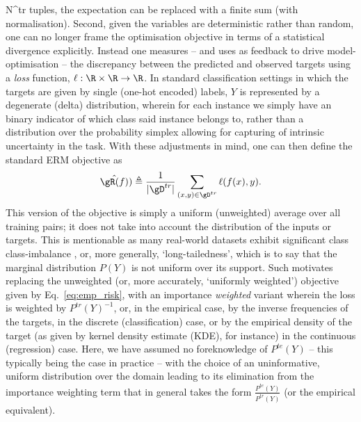 N^{tr} \) tuples, the expectation can be replaced with a finite sum (with normalisation). 
%
Second, given the variables are deterministic rather than random, one can no longer frame the
optimisation objective in terms of a statistical divergence explicitly. 
%
Instead one measures -- and uses as feedback to drive model-optimisation -- the discrepancy between
the predicted and observed targets using a \emph{loss} function, \( \ell: \R \times \R \to \R
\). 
%
In standard classification settings in which the targets are given by single (one-hot encoded)
labels, \( Y \) is represented by a degenerate (delta) distribution, wherein for each instance we
simply have an binary indicator of which class said instance belongs to, rather than a distribution
over the probability simplex allowing for capturing of intrinsic uncertainty in the task.
%
With these adjustments in mind, one can then define the standard ERM objective as
\begin{equation*}\label{eq:emp_risk} 
  \hat{\gR(f)}) \triangleq \frac{1}{|\gD^{tr}|}  \sum_{(x, y) \in \gD^{tr}} \ell (f(x), y).
\end{equation*}
%
This version of the objective is simply a uniform (unweighted) average
over all training pairs; it does not take into account the distribution of the inputs or targets.
%
This is mentionable as many real-world datasets exhibit significant class class-imbalance
\citep{zhu2014capturing, van2017devil}, or, more generally, `long-tailedness', which is to say that
the marginal distribution \( P(Y) \) is not uniform over its support.
Such motivates replacing the unweighted (or, more accurately, `uniformly weighted') objective
given by Eq.~\ref{eq:emp_risk}, with an importance  \emph{weighted} variant wherein the loss is
weighted by \( P^{tr}(Y)^{-1} \), or, in the empirical case, by the inverse frequencies of the
targets, in the discrete (classification) case, or by the empirical density of the target (as given
by kernel density estimate (KDE), for instance) in the continuous (regression) case.
Here, we have assumed no foreknowledge of \( P^{te}(Y) \) -- this typically being the case in
practice -- with the choice of an uninformative, uniform distribution over the domain leading to
its elimination from the importance weighting term that in general takes the form \( \frac{
  P^{te}(Y) }{ P^{tr}(Y) } \) (or the empirical equivalent).

